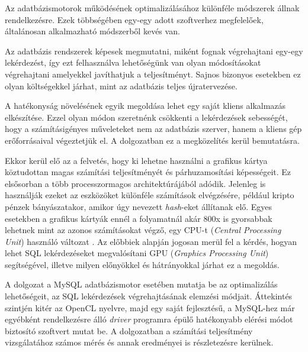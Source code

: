 
Az adatbázismotorok működésének optimalizálásához különféle módszerek állnak rendelkezésre. Ezek többségében egy-egy adott szoftverhez megfelelőek, általánosan alkalmazható módszerből kevés van.

Az adatbázis rendszerek képesek megmutatni, miként fognak végrehajtani egy-egy lekérdezést, így ezt felhasználva lehetőségünk van olyan módosításokat végrehajtani amelyekkel javíthatjuk a teljesítményt. Sajnos bizonyos esetekben ez olyan költségekkel járhat, mint az adatbázis teljes újratervezése.

A hatékonyság növelésének egyik megoldása lehet egy saját kliens alkalmazás elkészítése. Ezzel olyan módon szeretnénk csökkenti a lekérdezések sebességét, hogy a számításigényes műveleteket nem az adatbázis szerver, hanem a kliens gép erőforrásaival végeztetjük el. A dolgozatban ez a megközelítés kerül bemutatásra.

Ekkor kerül elő az a felvetés, hogy ki lehetne használni a grafikus kártya köztudottan magas számítási teljesítményét és párhuzamosítási képességeit. Ez elsősorban a több processzormagos architektúrájából adódik. Jelenleg is használják ezeket az eszközöket különféle számítások elvégzésére, például kripto pénzek bányászatakor, amikor úgy nevezett \textit{hash}-eket állítanak elő. Egyes esetekben a grafikus kártyák ennél a folyamatnál akár 800x is gyorsabbak lehetnek mint az azonos számításokat végző, egy CPU-t (\textit{Central Processing Unit}) használó változat \cite{crypto}. Az előbbiek alapján jogosan merül fel a kérdés, hogyan lehet SQL lekérdezéseket megvalósítani GPU (\textit{Graphics Processing Unit}) segítségével, illetve milyen előnyökkel és hátrányokkal járhat ez a megoldás.

A dolgozat a MySQL adatbázismotor esetében mutatja be az optimalizálás lehetőségeit, az SQL lekérdezések végrehajtásának elemzési módjait. Áttekintés szintjén kitér az OpenCL nyelvre, majd egy saját fejlesztésű, a MySQL-hez már egyébként rendelkezésre álló \textit{driver} programra épülő hatékonyabb elérési módot biztosító szoftvert mutat be. A dolgozatban a számítási teljesítmény vizsgálatához számos mérés és annak eredményei is részletezésre kerülnek.









